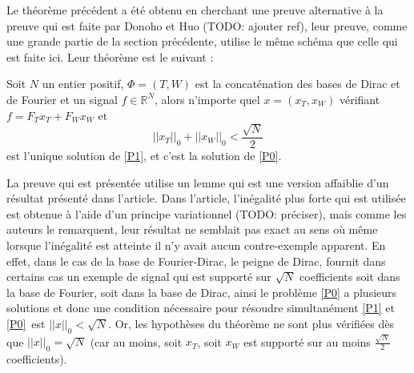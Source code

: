 \begin{remarque}
	Le théorème précédent a été obtenu en cherchant une preuve alternative à la preuve qui est faite par Donoho et Huo (TODO: ajouter ref), leur preuve, comme une grande partie de la section précédente, utilise le même schéma que celle qui est faite ici.
	Leur théorème est le suivant :
\begin{theoreme}
	Soit $N$ un entier positif, $\Phi = (T, W)$ est la concaténation des bases de Dirac et de Fourier et un signal $f\in \mathbb{R}^N$, alors n'importe quel $x = (x_T, x_W)$ vérifiant $f = F_T x_T + F_W x_W$ et
	\begin{equation}
		||x_T||_0 +  ||x_W||_0 < \frac{\sqrt{N}}{2}
	\end{equation}
	est l'unique solution de \ref{P1}, et c'est la solution de \ref{P0}.
\end{theoreme}
	La preuve qui est présentée utilise un lemme qui est une version affaiblie d'un résultat présenté dans l'article.
	Dans l'article, l'inégalité plus forte qui est utilisée est obtenue à l'aide d'un principe variationnel (TODO: préciser), mais comme les auteurs le remarquent, leur résultat ne semblait pas exact au sens où même lorsque l'inégalité est atteinte il n'y avait aucun contre-exemple apparent.
	En effet, dans le cas de la base de Fourier-Dirac, le peigne de Dirac, fournit dans certains cas un exemple de signal qui est supporté sur $\sqrt{N}$ coefficients soit dans la base de Fourier, soit dans la base de Dirac, ainsi le problème \ref{P0} a plusieurs solutions et donc une condition nécessaire pour résoudre simultanément \ref{P1} et \ref{P0} est $||x||_0 < \sqrt{N}$.
	Or, les hypothèses du théorème ne sont plus vérifiées dès que $||x||_0 = \sqrt{N}$ (car au moins, soit $x_T$, soit $x_W$ est supporté sur au moins $\frac{\sqrt{N}}{2}$ coefficients). 
\end{remarque}
